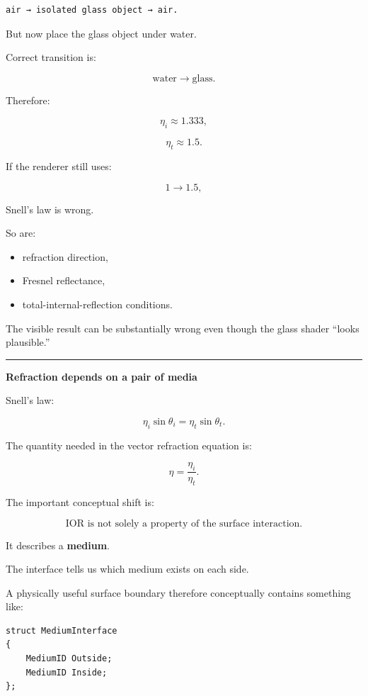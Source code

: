 \begin{verbatim}
air → isolated glass object → air.
\end{verbatim}

But now place the glass object under water.

Correct transition is:

\[
\text{water}
\rightarrow
\text{glass}.
\]

Therefore:

\[
\eta_i\approx1.333,
\]

\[
\eta_t\approx1.5.
\]

If the renderer still uses:

\[
1\rightarrow1.5,
\]

Snell's law is wrong.

So are:

\begin{itemize}
\tightlist
\item
  refraction direction,
\item
  Fresnel reflectance,
\item
  total-internal-reflection conditions.
\end{itemize}

The visible result can be substantially wrong even though the glass shader ``looks plausible.''

\begin{center}\rule{0.5\linewidth}{0.5pt}\end{center}

\textbf{Refraction depends on a pair of media}

Snell's law:

\[
\boxed{
\eta_i\sin\theta_i
=
\eta_t\sin\theta_t.
}
\]

The quantity needed in the vector refraction equation is:

\[
\boxed{
\eta=
\frac{\eta_i}{\eta_t}.
}
\]

The important conceptual shift is:

\[
\boxed{
\text{IOR is not solely a property of the surface interaction.}
}
\]

It describes a \textbf{medium}.

The interface tells us which medium exists on each side.

A physically useful surface boundary therefore conceptually contains something like:

\begin{verbatim}
struct MediumInterface
{
    MediumID Outside;
    MediumID Inside;
};
\end{verbatim}

